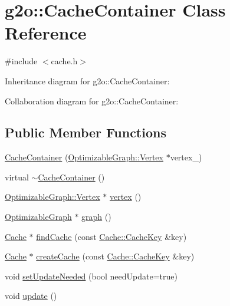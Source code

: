 \hypertarget{classg2o_1_1CacheContainer}{}\section{g2o\+:\+:Cache\+Container Class Reference}
\label{classg2o_1_1CacheContainer}


{\ttfamily \#include $<$cache.\+h$>$}



Inheritance diagram for g2o\+:\+:Cache\+Container\+:


Collaboration diagram for g2o\+:\+:Cache\+Container\+:
\subsection*{Public Member Functions}
\begin{DoxyCompactItemize}
\item 
\hyperlink{classg2o_1_1CacheContainer_aed510932f7e499f2fd3c1fdea7809052}{Cache\+Container} (\hyperlink{classg2o_1_1OptimizableGraph_1_1Vertex}{Optimizable\+Graph\+::\+Vertex} $\ast$vertex\+\_\+)
\item 
virtual \hyperlink{classg2o_1_1CacheContainer_a2eb9f659371a1af2c119fce3e2972e52}{$\sim$\+Cache\+Container} ()
\item 
\hyperlink{classg2o_1_1OptimizableGraph_1_1Vertex}{Optimizable\+Graph\+::\+Vertex} $\ast$ \hyperlink{classg2o_1_1CacheContainer_ada4f7f82992a85dbc742c1ab24c39c08}{vertex} ()
\item 
\hyperlink{structg2o_1_1OptimizableGraph}{Optimizable\+Graph} $\ast$ \hyperlink{classg2o_1_1CacheContainer_a4bf79d27bb9ae377446dfa7fd048b06d}{graph} ()
\item 
\hyperlink{classg2o_1_1Cache}{Cache} $\ast$ \hyperlink{classg2o_1_1CacheContainer_a2a0230117e0e71210f3d10a9e7143d0f}{find\+Cache} (const \hyperlink{classg2o_1_1Cache_1_1CacheKey}{Cache\+::\+Cache\+Key} \&key)
\item 
\hyperlink{classg2o_1_1Cache}{Cache} $\ast$ \hyperlink{classg2o_1_1CacheContainer_a08902c228901e06c4e08c5b594683a6c}{create\+Cache} (const \hyperlink{classg2o_1_1Cache_1_1CacheKey}{Cache\+::\+Cache\+Key} \&key)
\item 
void \hyperlink{classg2o_1_1CacheContainer_a2241f992e90c1078447553d0833ccf14}{set\+Update\+Needed} (bool need\+Update=true)
\item 
void \hyperlink{classg2o_1_1CacheContainer_acc9a6d1fbc828f55b1a6af1c29f003df}{update} ()
\end{DoxyCompactItemize}
